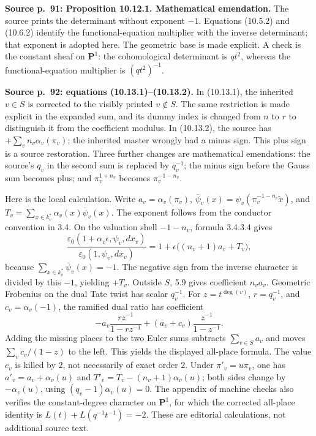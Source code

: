 \documentclass[10pt,letterpaper]{article}
\begin{document}
\begin{description}[style=nextline,leftmargin=2.6em,labelwidth=2.2em,font=\normalfont\bfseries]
\item[E09] \textbf{Source p.~91: Proposition 10.12.1. Mathematical emendation.} The source prints the determinant without exponent \(-1\). Equations (10.5.2) and (10.6.2) identify the functional-equation multiplier with the inverse determinant; that exponent is adopted here. The geometric base is made explicit. A check is the constant sheaf on \(\mathbf P^1\): the cohomological determinant is \(qt^2\), whereas the functional-equation multiplier is \((qt^2)^{-1}\).

\item[E10] \textbf{Source p.~92: equations (10.13.1)--(10.13.2).} In (10.13.1), the inherited \(v\in S\) is corrected to the visibly printed \(v\notin S\). The same restriction is made explicit in the expanded sum, and its dummy index is changed from \(n\) to \(r\) to distinguish it from the coefficient modulus. In (10.13.2), the source has \(+\sum_v n_v\alpha_v(\pi_v)\); the inherited master wrongly had a minus sign. This plus sign is a source restoration. Three further changes are mathematical emendations: the source's \(q_v\) in the second sum is replaced by \(q_v^{-1}\); the minus sign before the Gauss sum becomes plus; and \(\pi_v^{1+n_v}\) becomes \(\pi_v^{-1-n_v}\).

Here is the local calculation. Write \(a_v=\alpha_v(\pi_v)\), \(\overline\psi_v(x)=\psi_v(\pi_v^{-1-n_v}\widetilde x)\), and \(T_v=\sum_{x\in k_v^*}\alpha_v(x)\overline\psi_v(x)\). The exponent follows from the conductor convention in 3.4. On the valuation shell \(-1-n_v\), formula 3.4.3.4 gives
\[
 \frac{\varepsilon_0(1+\alpha_v\epsilon,\psi_v,dx_v)}{\varepsilon_0(1,\psi_v,dx_v)}=1+\epsilon\bigl((n_v+1)a_v+T_v\bigr),
\]
because \(\sum_{x\in k_v^*}\overline\psi_v(x)=-1\). The negative sign from the inverse character is divided by this \(-1\), yielding \(+T_v\). Outside \(S\), 5.9 gives coefficient \(n_va_v\). Geometric Frobenius on the dual Tate twist has scalar \(q_v^{-1}\). For \(z=t^{\deg(v)}\), \(r=q_v^{-1}\), and \(c_v=\alpha_v(-1)\), the ramified dual ratio has coefficient
\[
 -a_v\frac{rz^{-1}}{1-rz^{-1}}+(a_v+c_v)\frac{z^{-1}}{1-z^{-1}}.
\]
Adding the missing places to the two Euler sums subtracts \(\sum_{v\in S}a_v\) and moves \(\sum_v c_v/(1-z)\) to the left. This yields the displayed all-place formula. The value \(c_v\) is killed by \(2\), not necessarily of exact order \(2\). Under \(\pi'_v=u\pi_v\), one has \(a'_v=a_v+\alpha_v(u)\) and \(T'_v=T_v-(n_v+1)\alpha_v(u)\); both sides change by \(-\alpha_v(u)\), using \((q_v-1)\alpha_v(u)=0\). The appendix of machine checks also verifies the constant-degree character on \(\mathbf P^1\), for which the corrected all-place identity is \(L(t)+L(q^{-1}t^{-1})=-2\). These are editorial calculations, not additional source text.


\end{description}
\end{document}
